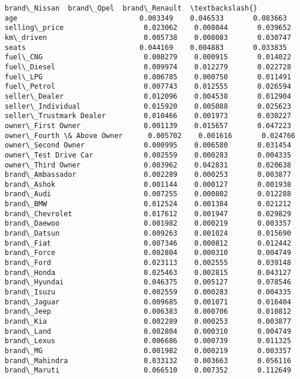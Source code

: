 \documentclass[11pt]{article}
\begin{document}
\begin{tcolorbox}[breakable, size=fbox, boxrule=.5pt, pad at break*=1mm, opacityfill=0]
\begin{Verbatim}[commandchars=\\\{\}]
                            brand\_Nissan  brand\_Opel  brand\_Renault  \textbackslash{}
age                             0.003349    0.046533       0.083663
selling\_price                   0.023062    0.008044       0.039652
km\_driven                       0.005738    0.008083       0.030747
seats                           0.044169    0.004883       0.033835
fuel\_CNG                        0.008279    0.000915       0.014022
fuel\_Diesel                     0.009974    0.012279       0.022728
fuel\_LPG                        0.006785    0.000750       0.011491
fuel\_Petrol                     0.007743    0.012555       0.026594
seller\_Dealer                   0.012096    0.004538       0.012904
seller\_Individual               0.015920    0.005088       0.025623
seller\_Trustmark Dealer         0.010466    0.001973       0.030227
owner\_First Owner               0.001139    0.015657       0.047223
owner\_Fourth \& Above Owner      0.005702    0.001616       0.024766
owner\_Second Owner              0.000995    0.006580       0.031454
owner\_Test Drive Car            0.002559    0.000283       0.004335
owner\_Third Owner               0.003962    0.042831       0.020638
brand\_Ambassador                0.002289    0.000253       0.003877
brand\_Ashok                     0.001144    0.000127       0.001938
brand\_Audi                      0.007255    0.000802       0.012288
brand\_BMW                       0.012524    0.001384       0.021212
brand\_Chevrolet                 0.017612    0.001947       0.029829
brand\_Daewoo                    0.001982    0.000219       0.003357
brand\_Datsun                    0.009263    0.001024       0.015690
brand\_Fiat                      0.007346    0.000812       0.012442
brand\_Force                     0.002804    0.000310       0.004749
brand\_Ford                      0.023113    0.002555       0.039148
brand\_Honda                     0.025463    0.002815       0.043127
brand\_Hyundai                   0.046375    0.005127       0.078546
brand\_Isuzu                     0.002559    0.000283       0.004335
brand\_Jaguar                    0.009685    0.001071       0.016404
brand\_Jeep                      0.006383    0.000706       0.010812
brand\_Kia                       0.002289    0.000253       0.003877
brand\_Land                      0.002804    0.000310       0.004749
brand\_Lexus                     0.006686    0.000739       0.011325
brand\_MG                        0.001982    0.000219       0.003357
brand\_Mahindra                  0.033132    0.003663       0.056116
brand\_Maruti                    0.066510    0.007352       0.112649

\end{Verbatim}
\end{tcolorbox}
\end{document}
